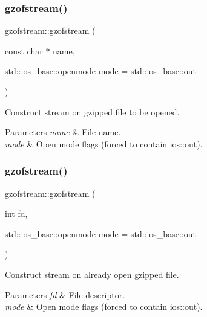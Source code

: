 \subsubsection{\texorpdfstring{gzofstream()}{gzofstream()}\hspace{0.1cm}{\footnotesize\ttfamily [3/4]}}
{\footnotesize\ttfamily gzofstream\+::gzofstream (\begin{DoxyParamCaption}\item[{const char $\ast$}]{name,  }\item[{std\+::ios\+\_\+base\+::openmode}]{mode = {\ttfamily std\+:\+:ios\+\_\+base\+:\+:out} }\end{DoxyParamCaption})\hspace{0.3cm}{\ttfamily [explicit]}}



Construct stream on gzipped file to be opened. 


\begin{DoxyParams}{Parameters}
{\em name} & File name. \\
\hline
{\em mode} & Open mode flags (forced to contain ios\+::out). \\
\hline
\end{DoxyParams}
\mbox{\label{classgzofstream_aa94d0c8414119a52f2a7f42aa0440941}} 
\subsubsection{\texorpdfstring{gzofstream()}{gzofstream()}\hspace{0.1cm}{\footnotesize\ttfamily [4/4]}}
{\footnotesize\ttfamily gzofstream\+::gzofstream (\begin{DoxyParamCaption}\item[{int}]{fd,  }\item[{std\+::ios\+\_\+base\+::openmode}]{mode = {\ttfamily std\+:\+:ios\+\_\+base\+:\+:out} }\end{DoxyParamCaption})\hspace{0.3cm}{\ttfamily [explicit]}}



Construct stream on already open gzipped file. 


\begin{DoxyParams}{Parameters}
{\em fd} & File descriptor. \\
\hline
{\em mode} & Open mode flags (forced to contain ios\+::out). \\
\hline
\end{DoxyParams}


